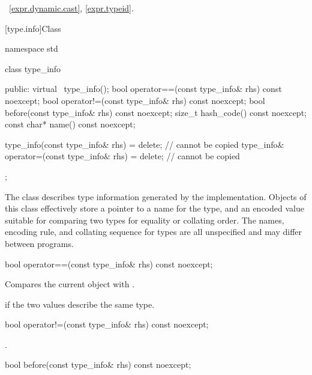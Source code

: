 \xref~\ref{expr.dynamic.cast}, \ref{expr.typeid}.

[type.info]{Class }

%
\begin{codeblock}
namespace std {
  class type_info {
  public:
    virtual ~type_info();
    bool operator==(const type_info& rhs) const noexcept;
    bool operator!=(const type_info& rhs) const noexcept;
    bool before(const type_info& rhs) const noexcept;
    size_t hash_code() const noexcept;
    const char* name() const noexcept;

    type_info(const type_info& rhs) = delete;            // cannot be copied
    type_info& operator=(const type_info& rhs) = delete; // cannot be copied
  };
}
\end{codeblock}

\pnum
The class
describes type information generated by the implementation.
Objects of this class effectively store a pointer to a name for the type, and
an encoded value suitable for comparing two types for equality or collating order.
The names, encoding rule, and collating sequence for types are all unspecified
%
and may differ between programs.

%
\begin{itemdecl}
bool operator==(const type_info& rhs) const noexcept;
\end{itemdecl}

\begin{itemdescr}
\pnum
\effects
Compares the current object with .

\pnum
\returns
{}
if the two values describe the same type.
\end{itemdescr}

%
\begin{itemdecl}
bool operator!=(const type_info& rhs) const noexcept;
\end{itemdecl}

\begin{itemdescr}
\pnum
\returns
{}.
\end{itemdescr}

%
\begin{itemdecl}
bool before(const type_info& rhs) const noexcept;
\end{itemdecl}


